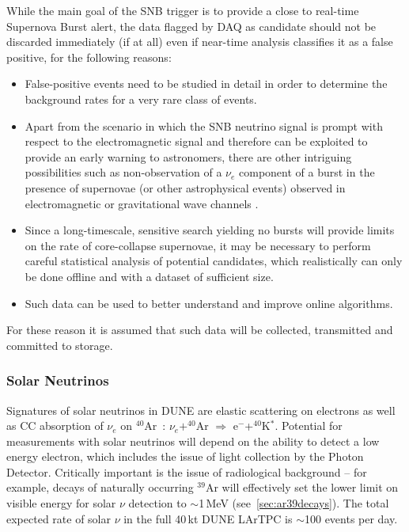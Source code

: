 While the main goal of the SNB trigger is to provide a close to real-time Supernova Burst alert, the data
flagged by DAQ as candidate should not be discarded immediately (if at all) even if near-time analysis
classifies it as a false positive, for the following reasons:
\begin{itemize}

\item False-positive events need to be studied in detail in order to determine the background
rates for a very rare class of events.

\item Apart from the scenario in which the SNB neutrino signal is prompt with respect to the electromagnetic signal
and therefore can be exploited to provide an early warning to astronomers, there are other intriguing possibilities
such as non-observation of a $\nu_e$ component of a burst in the presence
of supernovae (or other astrophysical events) observed in electromagnetic or gravitational wave
channels \cite{cdr_vol2}.

\item Since a long-timescale, sensitive search yielding no bursts will provide limits on the rate of core-collapse
supernovae, it may be necessary to perform careful statistical analysis of potential candidates, which realistically can only
be done offline and with a dataset of sufficient size.

\item Such data can be used to better understand and improve online algorithms.

\end{itemize}

For these reason it is assumed that such data will be collected, transmitted and committed to storage.


\subsubsection{Solar Neutrinos}
\label{sec:solar-data}
Signatures of solar neutrinos in DUNE are elastic scattering on electrons as well as CC absorption of $\nu_e$ on
$^{40}$Ar~\cite{cdr_vol2}: $\nu_e+^{40}$Ar $\Rightarrow$ e$^-$+$^{40}$K$^*$. Potential for measurements
with solar neutrinos will depend on the ability to detect a low energy electron, which includes the issue of light collection by
the Photon Detector. Critically important is the issue of radiological background -- for example, decays of naturally occurring
$^{39}$Ar will effectively set the lower limit on visible energy for solar $\nu$ detection to $\sim$1\,MeV (see~\ref{sec:ar39decays}).
The total expected rate of solar $\nu$ in the full 40\,kt DUNE LArTPC is $\sim$100 events per day.

